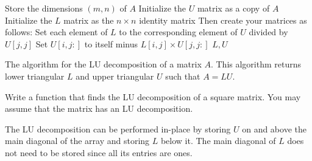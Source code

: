 %
%

\begin{algorithm}
\begin{algorithmic}[1]
\State Store the dimensions $(m, n)$ of $A$
\State Initialize the $U$ matrix as a copy of $A$
\State Initialize the $L$ matrix as the $n\times n$ identity matrix
\State Then create your matrices as follows:
    \State Set each element of $L$ to the corresponding element of $U$ divided by $U[j,j]$
    \State Set $U[i,j:]$ to itself minus $L[i,j] \times U[j,j:]$
    \EndFor
\EndFor
\State {} $L, U$
\EndProcedure
\end{algorithmic}
\caption{The algorithm for the LU decomposition of a matrix $A$. This algorithm returns lower triangular $L$ and upper triangular $U$ such that $A = LU$.}
\label{Alg:gram_schmidt}
\end{algorithm}

\begin{problem}
\label{prob:LU_copy}
Write a function that finds the LU decomposition of a square matrix.
You may assume that the matrix has an LU decomposition.
\end{problem}

The LU decomposition can be performed in-place by storing $U$ on and above the main diagonal of the array and storing $L$ below it.
The main diagonal of $L$ does not need to be stored since all its entries are ones.

